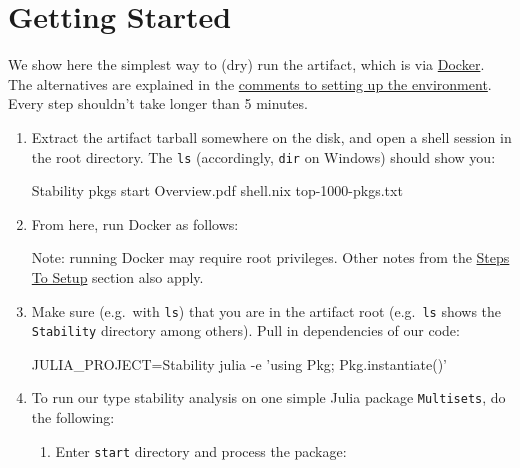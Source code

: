 \documentclass[
]{article}
\author{}
\date{}
\begin{document}
\hypertarget{getting-started}{%
\section{Getting Started}\label{getting-started}}

We show here the simplest way to (dry) run the artifact, which is via
\href{https://docs.docker.com/get-docker/}{Docker}. The alternatives are
explained in the
\protect\hyperlink{comments-on-setting-up-environment}{comments to
setting up the environment}. Every step shouldn't take longer than 5
minutes.

\begin{enumerate}
\def\labelenumi{\arabic{enumi}.}
\item
  Extract the artifact tarball somewhere on the disk, and open a shell
  session in the root directory. The \texttt{ls} (accordingly,
  \texttt{dir} on Windows) should show you:

\begin{verbnobox}[\small]
Stability    pkgs    start    Overview.pdf    shell.nix    top-1000-pkgs.txt
\end{verbnobox}
\item
  From here, run Docker as follows:

{\small
{}
}

  Note: running Docker may require root privileges. Other notes from the
  \protect\hyperlink{steps-to-setup}{Steps To Setup} section also apply.
\item
  Make sure (e.g.~with \texttt{ls}) that you are in the artifact root
  (e.g.~\texttt{ls} shows the \texttt{Stability} directory among
  others). Pull in dependencies of our code:

\begin{verbnobox}[\small]
JULIA_PROJECT=Stability julia -e 'using Pkg; Pkg.instantiate()'
\end{verbnobox}
\item
  To run our type stability analysis on one simple Julia package
  \texttt{Multisets}, do the following:

  \begin{enumerate}
  \def\labelenumii{\alph{enumii}.}
  \item
    Enter \texttt{start} directory and process the package:


\end{enumerate}
\end{enumerate}
\end{document}
